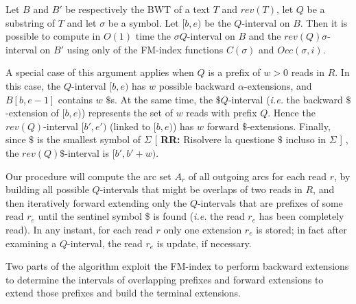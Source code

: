 \documentclass[runningheads,envcountsame,a4paper]{llncs}
\newcommand{\notaestesa}[2]{%
 \marginpar{\color{red!75!black}\textbf{\texttimes}}%
 {\color{red!75!black}%
 [\,\textbullet\,\textsf{\textbf{#1:}} %
 \textsf{\footnotesize#2}\,\textbullet\,]}%
}
\newcommand{\ie}{\textit{i.e.}\xspace}
\begin{document}
\begin{proposition}
\label{proposition:linked-intervals}
Let $B$ and $B'$ be respectively the BWT of a text $T$ and $rev(T)$, let $Q$ be a substring of $T$ and let $\sigma$ be a symbol.
Let $[b,e)$ be the $Q$-interval on $B$.
Then it is possible to compute in $O(1)$ time the $\sigma Q$-interval on $B$ and the $rev(Q) \sigma$-interval on $B'$
using only of the FM-index functions $C(\sigma)$ and $Occ(\sigma, i)$.
\end{proposition}

A special case of this argument applies when
$Q$ is a prefix of $w > 0$ reads in $R$.
In this case, the $Q$-interval $[b,e)$ has $w$ possible backward $\alpha$-extensions, and  $B[b,e-1]$ contains $w$ $\$$s.
At the same time, the $\$ Q$-interval (\ie the backward $\$$-extension of $[b,e)$) represents the set of $w$ reads with prefix $Q$.
Hence the $rev(Q)$-interval $[b',e')$ (linked to $[b,e)$) has $w$ forward $\$$-extensions.
Finally, since $\$$ is the smallest symbol of $\Sigma$ \notaestesa{RR}{Risolvere la questione $\$$ incluso in $\Sigma$}, the $rev(Q) \$$-interval is $[b',b'+w)$.




Our procedure will compute the arc set $A_r$ of all outgoing arcs for each read $r$,
by building all possible $Q$-intervals that might be overlaps of two
reads in $R$, and then iteratively forward extending only the $Q$-intervals that
are prefixes of some read $r_{e}$ until the sentinel symbol \$ is
found (\ie the read $r_{e}$ has been completely read).
In any instant, for each read $r$ only one extension $r_{e}$ is stored; in fact after examining a $Q$-interval, the read $r_{e}$ is update, if necessary.



Two parts of the algorithm exploit the FM-index to perform
backward extensions to determine the intervals of overlapping
prefixes and forward extensions to extend those prefixes and build the
terminal extensions.
\end{document}
